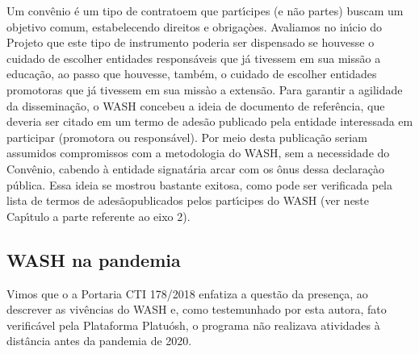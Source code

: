 \documentclass[
12pt,		%
openright,	%
twoside,  %
a4paper,			%
chapter=TITLE,		%
english,			%
french,				%
spanish,			%
brazil				%
]{USPSC-classe/USPSC}
\begin{document}
Um conv\^enio \'e um tipo de \textquotedbl contrato\textquotedbl  em que part\'{\i}cipes (e n\~ao partes) buscam um objetivo comum, estabelecendo direitos e obriga\c{c}òes. Avaliamos no in\'{\i}cio do Projeto que este tipo de instrumento poderia ser dispensado se houvesse o cuidado de escolher entidades respons\'aveis que j\'a tivessem em sua miss\~ao a educa\c{c}\~ao, ao passo que houvesse, tamb\'em, o cuidado de escolher entidades promotoras que j\'a tivessem em sua miss\`ao a extens\~ao. Para garantir a agilidade da dissemina\c{c}\~ao, o WASH concebeu a ideia de \textquotedbl documento de refer\^encia\textquotedbl , que deveria ser citado em um termo de ades\~ao publicado pela entidade interessada em participar (promotora ou respons\'avel). Por meio desta publica\c{c}\~ao seriam assumidos compromissos com a metodologia do WASH, sem a necessidade do Conv\^enio, cabendo \`a entidade signat\'aria arcar com os \^onus dessa declara\c{c}\`ao p\'ublica. Essa ideia se mostrou bastante exitosa, como pode ser verificada pela lista de \textquotedbl termos de ades\~ao\textquotedbl  publicados pelos part\'{\i}cipes do WASH (ver neste Cap\'{\i}tulo a parte referente ao eixo 2).

















\subsection[WASH na pandemia]{WASH na pandemia}\label{WASH na pandemia}
Vimos que o a Portaria CTI 178/2018 enfatiza a quest\~ao da \textquotedbl presen\c{c}a\textquotedbl , ao descrever as viv\^encias do WASH e, como testemunhado por esta autora, fato verific\'avel pela Plataforma Platu\'osh, o programa n\~ao realizava atividades \`a dist\^ancia antes da pandemia de 2020.
\end{document}
